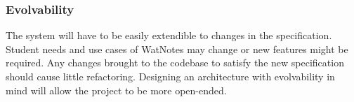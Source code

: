 \documentclass[12pt]{article}
\begin{document}
  \subsubsection{Evolvability}
  The system will have to be easily extendible to changes in the specification. Student needs and use cases of WatNotes may change or new features might be required. Any changes brought to the codebase to satisfy the new specification should cause little refactoring. Designing an architecture with evolvability in mind will allow the project to be more open-ended.
\end{document}
